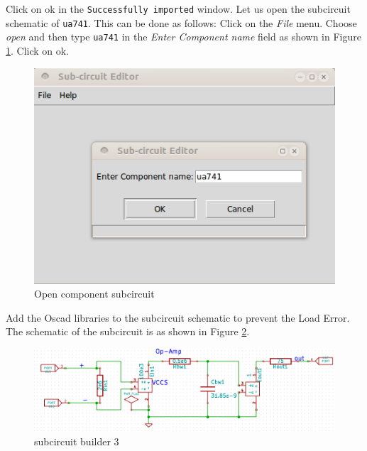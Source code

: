 \begin{enumerate}
Click on ok in the {\tt Successfully imported} window. Let us open the subcircuit schematic of {\tt ua741}. This can be done as follows: Click on the \textit{File} menu. Choose \textit{open} and then type {\tt ua741} in the \textit{Enter Component name} field as shown in Figure \ref{openua741}. Click on ok.
\begin{figure}
\begin{center}
\includegraphics[width=1\linewidth]{figures/openua741.png}%
\caption{Open component subcircuit}
\label{openua741}
\end{center}
\end{figure}
Add the Oscad libraries to the subcircuit schematic to prevent the Load Error. The schematic of the subcircuit is as shown in Figure \ref{23}. 
\begin{figure}%
\begin{center}
\includegraphics[width=1\linewidth]{figures/apd23.png}%
\caption{subcircuit builder 3}
\label{23}
\end{center}
\end{figure}


\end{enumerate}
